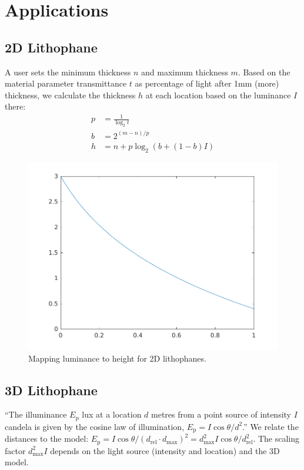 \section{Applications}

\subsection{2D Lithophane}
A user sets the minimum thickness  $n$ and maximum thickness $m$.
Based on the material parameter transmittance $t$ as percentage of light after 1mm (more) thickness,
we calculate the thickness $h$ at each location based on the luminance $I$ there:
\begin{align}
p &= \frac{1}{\log_2 t}
\\
b &= 2^{(m-n)/p}
\\
h &= n + p \log_2 ( b + (1-b) I )
\end{align}


\begin{figure}[H]
\centering
\includegraphics[width=.75\columnwidth]{sources/litho/luminance_to_thickness.pdf}
\caption{Mapping luminance to height for 2D lithophanes.}
\label{luminance_to_thickness}
\end{figure}






\subsection{3D Lithophane}
``The illuminance $E_\text{p}$ lux at a location $d$ metres from a point source of intensity $I$ candela is given by the cosine law of illumination,
$E_\text{p} = I \cos \theta / d^2$.''\cite{snow2001plant}
We relate the distances to the model: $E_\text{p} = I \cos \theta / (d_\text{rel} \cdot d_\text{max})^2 = d_\text{max}^2 I \cos \theta / d_\text{rel}^2$.
The scaling factor $d_\text{max}^2 I$ depends on the light source (intensity and location) and the 3D model.


